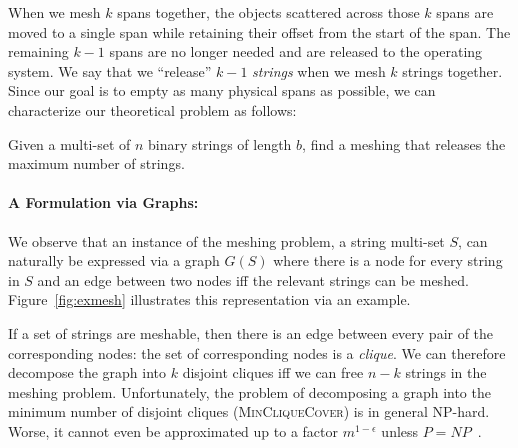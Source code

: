 When we mesh $k$ spans together, the objects scattered across those
$k$ spans are moved to a single span while retaining their offset from
the start of the span. The remaining $k-1$ spans are no longer needed
and are released to the operating system. We say that we ``release''
$k-1$ \emph{strings} when we mesh $k$ strings together.  Since our
goal is to empty as many physical spans as possible, we can
characterize our theoretical problem as follows:

\begin{problem}
Given a multi-set of $n$ binary strings of length $b$, find a meshing
that releases the maximum number of strings.
\end{problem}


\paragraph*{A Formulation via Graphs:}
\label{subsec:graph}

We observe that an instance of the meshing problem, a string multi-set
$S$, can naturally be expressed via a graph $G(S)$ where there is a
node for every string in $S$ and an edge between two nodes iff the
relevant strings can be meshed. Figure~\ref{fig:exmesh} illustrates
this representation via an example.



If a set of strings are meshable, then there is an edge between every
pair of the corresponding nodes: the set of corresponding nodes is a
\emph{clique}. We can therefore decompose the graph into $k$ disjoint
cliques iff we can free $n-k$ strings in the meshing
problem. Unfortunately, the problem of decomposing a graph into the
minimum number of disjoint cliques (\textsc{MinCliqueCover}) is in
general NP-hard. Worse, it cannot even be approximated up to a factor
$m^{1-\epsilon}$ unless $P=NP$~\cite{zuckerman07}.

